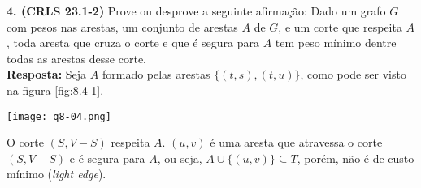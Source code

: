 
\noindent\textbf{4. (CRLS 23.1-2)} Prove ou desprove a seguinte afirmação: Dado um grafo $G$ com pesos nas arestas, um conjunto de arestas $A$ de $G$, e um corte que respeita $A$, toda aresta que cruza o corte e que é segura para $A$ tem peso mínimo dentre todas as arestas desse corte.\\[6pt]
\textbf{Resposta:} Seja $A$ formado pelas arestas $\{(t, s), (t, u)\}$, como pode ser visto na figura \ref{fig:8.4-1}.

\begin{center}
\texttt{[image: q8-04.png]}
\label{fig:8.4-1}
\end{center}

O corte $(S, V - S)$ respeita $A$. $(u, v)$ é uma aresta que atravessa o corte $(S, V - S)$ e é segura para $A$, ou seja, $A \cup \{(u, v)\} \subseteq T$, porém, não é de custo mínimo (\textit{light edge}).